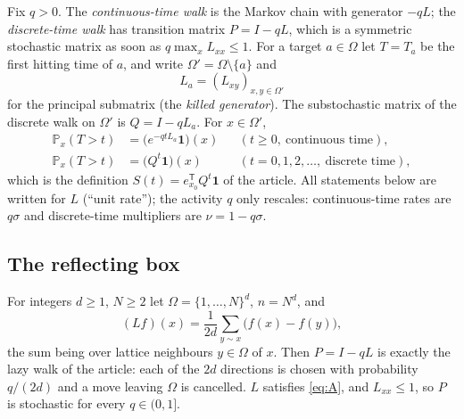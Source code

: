 \documentclass[11pt,a4paper]{article}
\newcommand{\one}{\mathbf 1}
\newcommand{\PP}{\mathbb P}
\theoremstyle{plain}
\theoremstyle{definition}
\numberwithin{equation}{section}
\begin{document}
Fix $q>0$. The \emph{continuous-time walk} is the Markov chain with generator $-qL$; the \emph{discrete-time walk} has transition matrix $P=I-qL$, which is a symmetric stochastic matrix as soon as $q\max_x L_{xx}\le 1$. For a target $a\in\Omega$ let $T=T_a$ be the first hitting time of $a$, and write $\Omega'=\Omega\setminus\{a\}$ and
\[
L_a=(L_{xy})_{x,y\in\Omega'}
\]
for the principal submatrix (the \emph{killed generator}). The substochastic matrix of the discrete walk on $\Omega'$ is $Q=I-qL_a$. For $x\in\Omega'$,
\begin{equation}\label{eq:surv}
\begin{aligned}\PP_x(T>t)&=\big(e^{-qtL_a}\one\big)(x)&&(t\ge0,\ \text{continuous time}),\\
\PP_x(T>t)&=\big(Q^{t}\one\big)(x)&&(t=0,1,2,\dots,\ \text{discrete time}),\end{aligned}
\end{equation}
which is the definition $S(t)=e_{x_0}^{\mathsf T}Q^t\one$ of the article. All statements below are written for $L$ (``unit rate''); the activity $q$ only rescales: continuous-time rates are $q\sigma$ and discrete-time multipliers are $\nu=1-q\sigma$.

\subsection{The reflecting box}
For integers $d\ge1$, $N\ge2$ let $\Omega=\{1,\dots,N\}^d$, $n=N^d$, and
\begin{equation}\label{eq:boxL}
(Lf)(x)=\frac1{2d}\sum_{y\sim x}\big(f(x)-f(y)\big),
\end{equation}
the sum being over lattice neighbours $y\in\Omega$ of $x$. Then $P=I-qL$ is exactly the lazy walk of the article: each of the $2d$ directions is chosen with probability $q/(2d)$ and a move leaving $\Omega$ is cancelled. $L$ satisfies \eqref{eq:A}, and $L_{xx}\le1$, so $P$ is stochastic for every $q\in(0,1]$.
\end{document}
